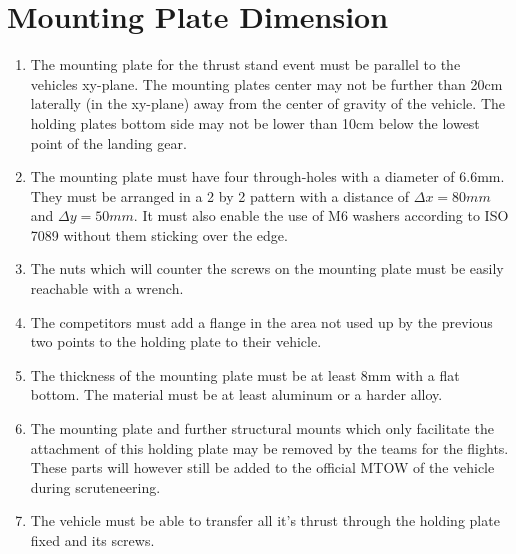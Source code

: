 \documentclass{article}
\begin{document}
\section{Mounting Plate Dimension}
\begin{enumerate}
  \item The mounting plate for the thrust stand event must be parallel to the vehicles xy-plane. The mounting plates center may not be further than 20cm laterally (in the xy-plane) away from the center of gravity of the vehicle. The holding plates bottom side may not be lower than 10cm below the lowest point of the landing gear. 
  \item The mounting plate must have four through-holes with a diameter of 6.6mm. They must be arranged in a 2 by 2 pattern with a distance of ${\Delta}x=80mm$ and ${\Delta}y=50mm$. It must also enable the use of M6 washers according to ISO 7089 without them sticking over the edge.
  \item The nuts which will counter the screws on the mounting plate must be easily reachable with a wrench.  
  \item The competitors must add a flange in the area not used up by the previous two points to the holding plate to their vehicle. 
  \item The thickness of the mounting plate must be at least 8mm with a flat bottom. The material must be at least aluminum or a harder alloy.
  \item The mounting plate and further structural mounts which only facilitate the attachment of this holding plate may be removed by the teams for the flights. These parts will however still be added to the official MTOW of the vehicle during scruteneering.
  \item The vehicle must be able to transfer all it's thrust through the holding plate fixed and its screws. 
\end{enumerate}
\end{document}
